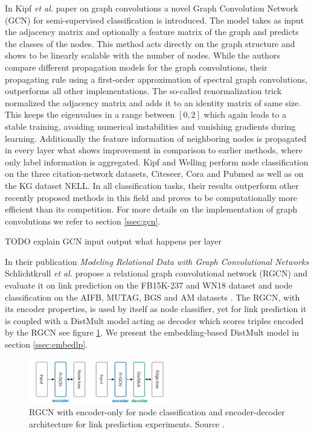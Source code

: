 In Kipf \textit{et al.} paper on graph convolutions \cite{kipf_semi-supervised_2017} a novel Graph Convolution Network (GCN) for semi-supervised classification is introduced. The model takes as input the adjacency matrix and optionally a feature matrix of the graph and predicts the classes of the nodes. This method acts directly on the graph structure and shows to be linearly scalable with the number of nodes. While the authors compare different propagation models for the graph convolutions, their propagating rule using a first-order approximation of spectral graph convolutions, outperforms all other implementations. The so-called renormalization trick normalized the adjacency matrix and adds it to an identity matrix of same size. This keeps the eigenvalues in a range between $[0,2]$ which again leads to a stable training, avoiding numerical instabilities and vanishing gradients during learning. Additionally the feature information of neighboring nodes is propagated in every layer what shows improvement in comparison to earlier methods, where only label information is aggregated.
Kipf and Welling perform node classification on the three citation-network datasets, Citeseer, Cora and Pubmed as well as on the KG dataset NELL. In all classification tasks, their results outperform other recently proposed methods in this field and proves to be computationally more efficient than its competition. For more details on the implementation of graph convolutions we refer to section \ref{ssec:gcn}. 

TODO explain GCN input output what happens per layer

In their publication \textit{Modeling Relational Data with Graph Convolutional Networks} Schlichtkrull \textit{et al.} propose a relational graph convolutional network (RGCN) and evaluate it on link prediction on the FB15K-237 and WN18 dataset and node classification on the AIFB, MUTAG, BGS and AM datasets \cite{gangemi_modeling_2018}. The RGCN, with its encoder properties, is used by itself as node classifier, yet for link prediction it is coupled with a DistMult model acting as decoder which scores triples encoded by the RGCN see figure \ref{fig:RGCN}. We present the embedding-based DistMult model in section \ref{ssec:embedlp}.

\begin{figure}[h]
    \centering
    \includegraphics[width=0.55\textwidth]{data/images/RGCN.png}
    \caption{RGCN with encoder-only for node classification and encoder-decoder architecture for link prediction experiments. Source \cite{gangemi_modeling_2018}.}
    \label{fig:RGCN}
\end{figure}

